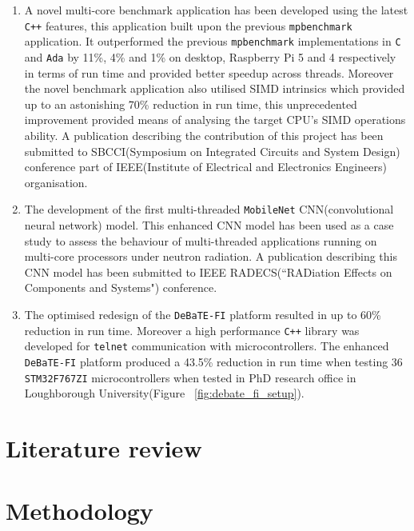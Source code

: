 \documentclass[12pt, openany]{book}
\begin{document}
\begin{enumerate}
	\item A novel multi-core benchmark application has been developed using the latest \texttt{C++} features, this application built upon the previous \texttt{mpbenchmark}\cite{mpbenchmark_paper} application. It outperformed the previous \texttt{mpbenchmark} implementations in \texttt{C} and \texttt{Ada} by 11\%, 4\% and 1\% on desktop, Raspberry Pi 5 and 4 respectively in terms of run time and provided better speedup across threads. Moreover the novel benchmark application also utilised SIMD intrinsics which provided up to an astonishing 70\% reduction in run time, this unprecedented improvement provided means of analysing the target CPU's SIMD operations ability. A publication describing the contribution of this project has been submitted to SBCCI(Symposium on Integrated Circuits and System Design) conference part of IEEE(Institute of Electrical and Electronics Engineers) organisation. 
	
	\item The development of the first multi-threaded \texttt{MobileNet} CNN(convolutional neural network) model. This enhanced CNN model has been used as a case study to assess the behaviour of multi-threaded applications running on multi-core processors under neutron radiation. A publication describing this CNN model has been submitted to IEEE RADECS(``RADiation Effects on Components and Systems") conference.
	
	\item The optimised redesign of the \texttt{DeBaTE-FI} platform\cite{debate_fi_publication} resulted in up to 60\% reduction in run time. Moreover a high performance \texttt{C++} library was developed for \texttt{telnet} communication with microcontrollers. The enhanced \texttt{DeBaTE-FI} platform produced a 43.5\% reduction in run time when testing 36 \texttt{STM32F767ZI} microcontrollers when tested in PhD research office in Loughborough University(Figure ~\ref{fig:debate_fi_setup}).
\end{enumerate}


\chapter{Literature review}



\chapter{Methodology}

\end{document}
